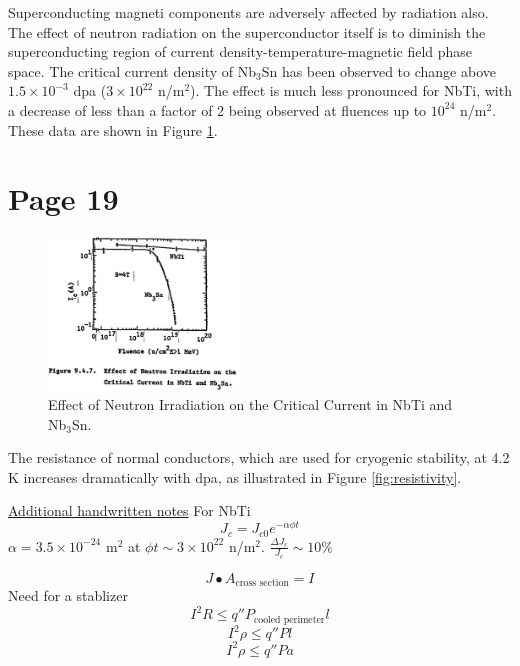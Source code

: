 \documentclass[11pt]{report} %
\begin{document}
Superconducting magneti components are adversely affected by radiation also. The effect of neutron radiation on the superconductor itself is to diminish the superconducting region of current density-temperature-magnetic field phase space. The critical current density of Nb$_3$Sn has been observed to change above ~$1.5\times 10^{-3}$ dpa ($3\times 10^{22}$ n/m$^2$). The effect is much less pronounced for NbTi, with a decrease of less than a factor of 2 being observed at fluences up to $10^{24}$ n/m$^2$. These data are shown in Figure \ref{fig:irradiationEffect}.

\section{Page 19}

\begin{figure}[H]
  \centering
  \includegraphics[width=0.45\textwidth]{figs/irradiationEffect.png}
  \caption{Effect of Neutron Irradiation on the Critical Current in NbTi and Nb$_3$Sn.}
  \label{fig:irradiationEffect}
\end{figure}

The resistance of normal conductors, which are used for cryogenic stability, at 4.2 K increases dramatically with dpa, as illustrated in Figure \ref{fig:resistivity}.

\underline{Additional handwritten notes}
For NbTi
\begin{equation}
  J_c = J_{c0} e^{-\alpha \phi t}
\end{equation}
$\alpha = 3.5 \times 10^{-24}$ m$^2$ at $\phi t \sim 3 \times 10^{22}$ n/m$^2$.
$\frac{\Delta J_c}{J_c} \sim 10\%$

\begin{equation}
  J \bullet A_{\text{cross section}} = I
\end{equation}
Need for a stablizer
\begin{equation}
  I^2 R \le q'' P_{\text{cooled perimeter}} l
\end{equation}
\begin{equation}
  I^2 \rho \le q'' P l
\end{equation}
\begin{equation}
  I^2 \rho \le q'' Pa
\end{equation}
\end{document}
